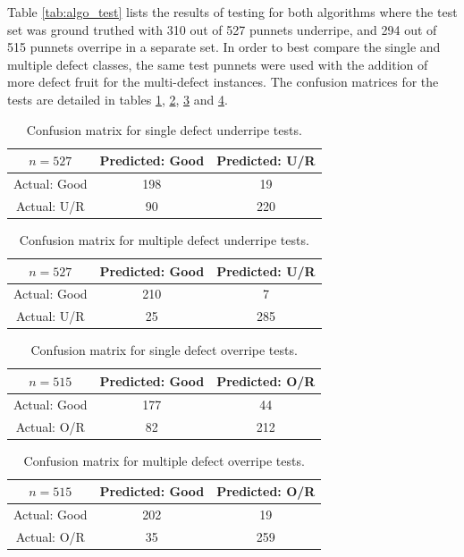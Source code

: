 \documentclass[conference]{IEEEtran}
\begin{document}
Table \ref{tab:algo_test} lists the results of testing for both algorithms where the test set was ground truthed with 310 out of 527 punnets underripe, and 294 out of 515 punnets overripe in a separate set. In order to best compare the single and multiple defect classes, the same test punnets were used with the addition of more defect fruit for the multi-defect instances. The confusion matrices for the tests are detailed in tables \ref{tab:confusion_1},  \ref{tab:confusion_2}, \ref{tab:confusion_3} and \ref{tab:confusion_4}.

\begin{table}
	\centering
	\caption{Confusion matrix for single defect underripe tests.}
	\label{tab:confusion_1}
	\begin{tabular}{ccc}
		\toprule
		$n=527$ & Predicted: Good & Predicted: U/R  \\ 
		\midrule
		Actual: Good   & 198 & 19    \\[6pt] 
		Actual: U/R	   & 90  & 220  \\[6pt] 
		\bottomrule
	\end{tabular}
\end{table}

\begin{table}
	\centering
	\caption{Confusion matrix for multiple defect underripe tests.}
	\label{tab:confusion_2}
	\begin{tabular}{ccc}
		\toprule
		$n=527$ & Predicted: Good & Predicted: U/R  \\ 
		\midrule
		Actual: Good   & 210 & 7    \\[6pt] 
		Actual: U/R	   & 25  & 285  \\[6pt] 
		\bottomrule
	\end{tabular}
\end{table}

\begin{table}
	\centering
	\caption{Confusion matrix for single defect overripe tests.}
	\label{tab:confusion_3}
	\begin{tabular}{ccc}
		\toprule
		$n=515$ & Predicted: Good & Predicted: O/R  \\ 
		\midrule
		Actual: Good   & 177 & 44    \\[6pt] 
		Actual: O/R	   & 82  & 212  \\[6pt] 
		\bottomrule
	\end{tabular}
\end{table}

\begin{table}
	\centering
	\caption{Confusion matrix for multiple defect overripe tests.}
	\label{tab:confusion_4}
	\begin{tabular}{ccc}
		\toprule
		$n=515$ & Predicted: Good & Predicted: O/R  \\ 
		\midrule
		Actual: Good   & 202 & 19    \\[6pt] 
		Actual: O/R	   & 35  & 259  \\[6pt] 
		\bottomrule
	\end{tabular}
\end{table}
\end{document}
